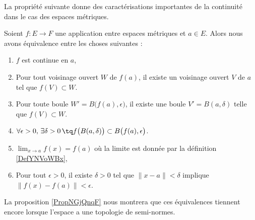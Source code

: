 La propriété suivante donne des caractérisations importantes de la continuité dans le cas des espaces métriques.
\begin{proposition} \label{PropQZRNpMn}
    Soient \( f\colon E\to F\) une application entre espaces métriques et \( a\in E\). Alors nous avons équivalence entre les choses suivantes :
    \begin{enumerate}
        \item\label{ItemCBUoRWJi}
            \( f\) est continue en \( a\),
        \item\label{ItemCBUoRWJii}
            Pour tout voisinage ouvert \( W\) de \( f(a)\), il existe un voisinage ouvert \( V\) de \( a\) tel que \( f(V)\subset W\).
        \item\label{ItemCBUoRWJiii}
            Pour toute boule \( W'=B\big( f(a),\epsilon \big)\), il existe une boule \( V'=B(a,\delta)\) telle que \( f(V)\subset W\).
        \item\label{ItemCBUoRWJiv}
            $\forall \epsilon>0,\,\exists \delta>0\,\tq f\big( B(a,\delta) \big)\subset B\big( f(a),\epsilon \big)$.
        \item\label{ItemYNQpikrii}
            \( \lim_{x\to a}f(x)=f(a)\) où la limite est donnée par la définition \ref{DefYNVoWBx},
        \item\label{ItemYNQpikriii}
            Pour tout \( \epsilon>0\), il existe \( \delta>0\) tel que \( \| x-a \|<\delta\) implique \( \| f(x)-f(a) \|<\epsilon\).
    \end{enumerate}
\end{proposition}
La proposition \ref{PropNGjQnqF} nous montrera que ces équivalences tiennent encore lorsque l'espace a une topologie de semi-normes.

